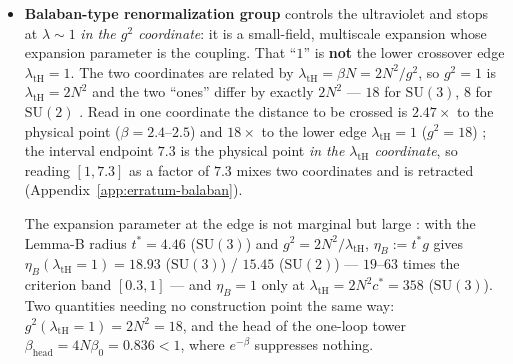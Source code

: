 \begin{itemize}
\item \textbf{Balaban-type renormalization group} controls the ultraviolet and stops at
  $\lambda\sim1$ \emph{in the $g^2$ coordinate}: it is a small-field, multiscale expansion whose
  expansion parameter is the coupling. That ``$1$'' is \textbf{not} the lower crossover edge
  $\lambda_{\mathrm{tH}}=1$. The two coordinates are related by $\lambda_{\mathrm{tH}}=\beta N=2N^2
  /g^2$, so $g^2=1$ is $\lambda_{\mathrm{tH}}=2N^2$ and the two ``ones'' differ by exactly $2N^2$
  --- $18$ for $\mathrm{SU}(3)$, $8$ for $\mathrm{SU}(2)$ \LT. Read in one coordinate the distance to
  be crossed is $2.47\times$ to the physical point ($\beta=2.4$--$2.5$) and $18\times$ to the
  lower edge $\lambda_{\mathrm{tH}}=1$ ($g^2=18$) \LE; the interval endpoint $7.3$ is the physical
  point \emph{in the $\lambda_{\mathrm{tH}}$ coordinate}, so reading $[1,7.3]$ as a factor of
  $7.3$ mixes two coordinates and is retracted (Appendix~\ref{app:erratum-balaban}).

  The expansion parameter at the edge is not marginal but large \LE: with the Lemma-B radius
  $t^*=4.46$ ($\mathrm{SU}(3)$) and $g^2=2N^2/\lambda_{\mathrm{tH}}$,
  $\eta_B:=t^*g$ gives $\eta_B(\lambda_{\mathrm{tH}}=1)=18.93$ ($\mathrm{SU}(3)$) / $15.45$
  ($\mathrm{SU}(2)$) --- $19$--$63$ times the criterion band $[0.3,1]$ --- and $\eta_B=1$ only at
  $\lambda_{\mathrm{tH}}=2N^2c^*=358$ ($\mathrm{SU}(3)$). Two quantities needing no construction
  point the same way: $g^2(\lambda_{\mathrm{tH}}=1)=2N^2=18$, and the head of the one-loop tower
  $\beta_{\mathrm{head}}=4N\beta_0=0.836<1$, where $e^{-\beta}$ suppresses nothing.


\end{itemize}
